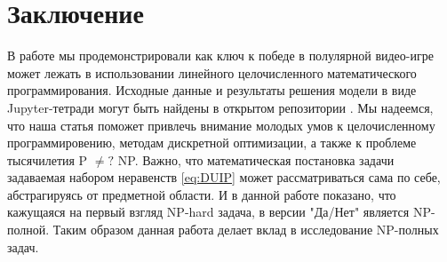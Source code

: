 \documentclass{article}
\begin{document}
\section{Заключение}
\label{SectionConclusion}
В работе мы продемонстрировали как ключ к победе в полулярной видео-игре может лежать в использовании линейного целочисленного математического программирования. 
Исходные данные и результаты решения модели в виде Jupyter-тетради могут быть найдены в открытом репозитории \cite{UnderLordsInput}.
Мы надеемся, что наша статья поможет привлечь внимание молодых умов к целочисленному программировению, методам дискретной оптимизации, а также к проблеме тысячилетия P $\neq ?$ NP. 
Важно, что математическая постановка задачи задаваемая набором неравенств \eqref{eq:DUIP} может  рассматриваться сама по себе, абстрагируясь от предметной области. И в данной работе показано, что кажущаяся на первый взгляд NP-hard задача, в версии "Да/Нет" является NP-полной. 
Таким образом данная работа делает вклад в исследование NP-полных задач. 



\end{document}
